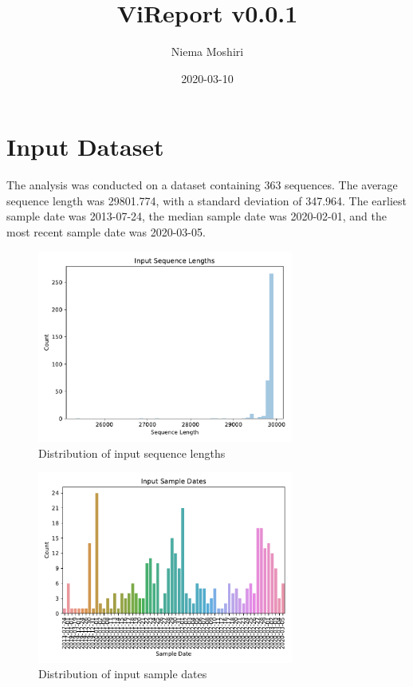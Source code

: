 \documentclass{article}
\title{\vspace{-2.0cm}ViReport v0.0.1}
\author{Niema Moshiri}
\date{2020-03-10}
\begin{document}
\maketitle

\section{Input Dataset}
The analysis was conducted on a dataset containing 363 sequences.
The average sequence length was 29801.774,
with a standard deviation of 347.964.
The earliest sample date was 2013-07-24,
the median sample date was 2020-02-01,
and the most recent sample date was 2020-03-05.


\begin{figure}[h]
\centering
\includegraphics[width=0.75\textwidth,keepaspectratio]{./figs/input_sequence_lengths.pdf}
\caption{Distribution of input sequence lengths}
\end{figure}



\begin{figure}[h]
\centering
\includegraphics[width=0.75\textwidth,keepaspectratio]{./figs/input_sample_dates.pdf}
\caption{Distribution of input sample dates}
\end{figure}
\end{document}
